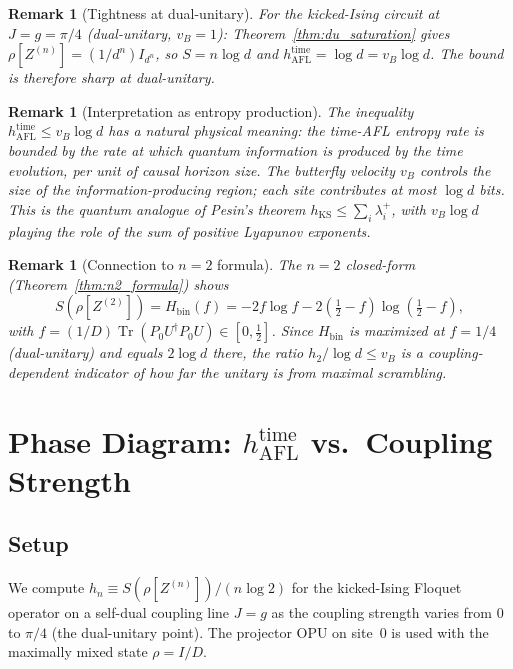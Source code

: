 \documentclass[12pt,a4paper]{article}
\newtheorem{remark}[theorem]{Remark}
\begin{document}
\begin{remark}[Tightness at dual-unitary]
For the kicked-Ising circuit at $J=g=\pi/4$ (dual-unitary, $v_B=1$):
Theorem~\ref{thm:du_saturation} gives $\rho[Z^{(n)}]=(1/d^n)I_{d^n}$, so
$S=n\log d$ and $h_{\mathrm{AFL}}^{\mathrm{time}}=\log d=v_B\log d$.
The bound is therefore \emph{sharp} at dual-unitary.
\end{remark}

\begin{remark}[Interpretation as entropy production]
The inequality $h_{\mathrm{AFL}}^{\mathrm{time}}\leq v_B\log d$ has a natural
physical meaning: the time-AFL entropy rate is bounded by the rate at which
quantum information is produced by the time evolution, per unit of causal
horizon size.  The butterfly velocity $v_B$ controls the size of the
information-producing region; each site contributes at most $\log d$ bits.
This is the quantum analogue of Pesin's theorem
$h_{\mathrm{KS}}\leq\sum_i\lambda_i^+$, with $v_B\log d$ playing the role
of the sum of positive Lyapunov exponents.
\end{remark}

\begin{remark}[Connection to $n=2$ formula]
The $n=2$ closed-form (Theorem~\ref{thm:n2_formula}) shows
\[
  S(\rho[Z^{(2)}]) = H_{\mathrm{bin}}(f)
  = -2f\log f -2\!\left(\tfrac12-f\right)\!\log\!\left(\tfrac12-f\right),
\]
with $f = (1/D)\operatorname{Tr}(P_0 U^{\dagger}P_0 U)\in[0,\tfrac12]$.  Since
$H_{\mathrm{bin}}$ is maximized at $f=1/4$ (dual-unitary) and equals
$2\log d$ there, the ratio $h_2/\log d\leq v_B$ is a coupling-dependent
indicator of how far the unitary is from maximal scrambling.
\end{remark}

\section{Phase Diagram: \texorpdfstring{$h_{\mathrm{AFL}}^{\mathrm{time}}$}{h}
  vs.\ Coupling Strength}
\label{sec:phase_diagram}

\subsection{Setup}

We compute $h_n \equiv S(\rho[Z^{(n)}])/(n\log 2)$ for the kicked-Ising
Floquet operator on a self-dual coupling line $J=g$ as the coupling
strength varies from $0$ to $\pi/4$ (the dual-unitary point).  The
projector OPU on site~$0$ is used with the maximally mixed state $\rho=I/D$.
\end{document}
